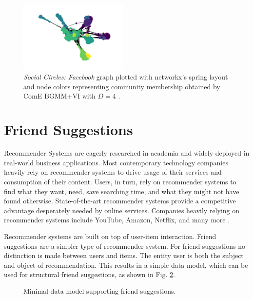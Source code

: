 \documentclass[conference]{IEEEtran}
\begin{document}
\begin{figure}[htbp]
    \centering
    \includegraphics[width=0.48\textwidth]{images/fb/graph_d4.png}
    \caption{\textit{Social Circles: Facebook} graph plotted with networkx's spring layout and node colors representing community membership obtained by ComE BGMM+VI with $D=4$ \cite{networkx}.}
    \label{fig:fb_graph}
\end{figure}


\section{Friend Suggestions}

Recommender Systems are eagerly researched in academia and widely deployed in real-world business applications. Most contemporary technology companies heavily rely on recommender systems to drive usage of their services and consumption of their content. Users, in turn, rely on recommender systems to find what they want, need, save searching time, and what they might not have found otherwise. State-of-the-art recommender systems provide a competitive advantage desperately needed by online services. Companies heavily relying on recommender systems include YouTube, Amazon, Netflix, and many more \cite{Rocca19}.

Recommender systems are built on top of user-item interaction. Friend suggestions are a simpler type of recommender system. For friend suggestions no distinction is made between users and items. The entity user is both the subject and object of recommendation. This results in a simple data model, which can be used for structural friend suggestions, as shown in Fig. \ref{fig:data_model}.

\begin{figure}[htbp]
    \centering
    \caption{Minimal data model supporting friend suggestions.}
    \label{fig:data_model}
\end{figure}
\end{document}
